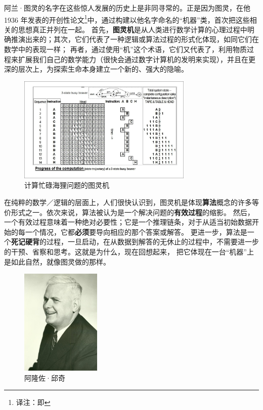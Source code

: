 \documentclass[a4paper,12pt]{article}
\begin{document}
阿兰·图灵的名字在这些惊人发展的历史上是非同寻常的。正是因为图灵，在他 1936 年发表的开创性论文\footnote[3]{译注：即\cite{TuringA1937}}中，通过构建以他名字命名的“机器”类，首次把这些相关的思想真正并列在一起。
首先，\textbf{\gls{图灵机}}是从人类进行数学计算的心理过程中明确推演出来的；其次，它们代表了一种逻辑或算法过程的\gls{形式化}体现，如同它们在数学中的表现一样；
再者，通过使用“机”这个术语，它们又代表了，利用\gls{物质过程}来扩展我们自己的数学能力（很快会通过\gls{数字计算机}的发明来实现），并且在更深的层次上，为探索生命本身建立一个新的、强大的隐喻。

\begin{figure}[ht]
\centering
\includegraphics[height=2.0in]{images/turing_machine.jpg}
\caption{计算忙碌海狸问题的图灵机}
\end{figure}

在纯粹的数学／逻辑的层面上，人们很快认识到，\gls{图灵机}是体现\textbf{\gls{算法}}概念的许多等价形式之一。依次来说，\gls{算法}被认为是一个解决问题的\textbf{\gls{有效过程}}的缩影。
然后，一个\gls{有效过程}意味着一种绝对必要性；它是一个\gls{推理链条}，对于从适当初始数据开始的每一个情况，它都\textbf{必须}要导向相应的那个答案或解答。
更进一步，\gls{算法}是一个\textbf{死记硬背}的过程，一旦启动，在从数据到解答的无休止的过程中，不需要进一步的干预、省察和思考。这就是为什么，现在回想起来，
把它体现在一台“机器”上是如此自然，就像图灵做的那样。

\begin{figure}
  \begin{center}
    \includegraphics[height=2.0in]{images/alonzo_church.jpg}
  \end{center}
  \caption{阿隆佐·邱奇}
\end{figure}
\end{document}
